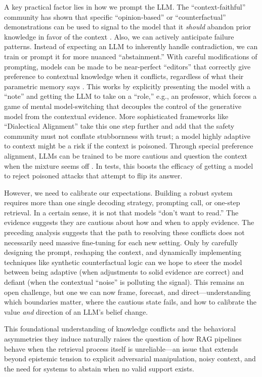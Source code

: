 \documentclass[11pt]{article}
\begin{document}
A key practical factor lies in how we prompt the LLM. The ``context-faithful'' community has shown that specific ``opinion-based'' or ``counterfactual'' demonstrations can be used to signal to the model that it \emph{should} abandon prior knowledge in favor of the context \cite{ref254}. Also, we can actively anticipate failure patterns. Instead of expecting an LLM to inherently handle contradiction, we can train or prompt it for more nuanced ``abstainment.'' With careful modifications of prompting, models can be made to be near-perfect ``editors'' that correctly give preference to contextual knowledge when it conflicts, regardless of what their parametric memory says \cite{ref255}. This works by explicitly presenting the model with a ``note'' and getting the LLM to take on a ``role,'' e.g., an professor, which forces a game of mental model-switching that decouples the control of the generative model from the contextual evidence. More sophisticated frameworks like ``Dialectical Alignment'' take this one step further and add that the safety community must not conflate stubbornness with trust; a model highly adaptive to context might be a risk if the context is poisoned. Through special preference alignment, LLMs can be trained to be more cautious and question the context when the mixture seems off \cite{ref180}. In tests, this boosts the efficacy of getting a model to reject poisoned attacks that attempt to flip its answer.

However, we need to calibrate our expectations. Building a robust system requires more than one single decoding strategy, prompting call, or one-step retrieval. In a certain sense, it is not that models ``don't want to read.'' The evidence suggests they are cautious about how and when to apply evidence. The preceding analysis suggests that the path to resolving these conflicts does not necessarily need massive fine-tuning for each new setting. Only by carefully designing the prompt, reshaping the context, and dynamically implementing techniques like synthetic counterfactual logic can we hope to steer the model between being adaptive (when adjustments to solid evidence are correct) and defiant (when the contextual ``noise'' is polluting the signal). This remains an open challenge, but one we can now frame, forecast, and direct---understanding which boundaries matter, where the cautious state fails, and how to calibrate the value \emph{and} direction of an LLM's belief change.

This foundational understanding of knowledge conflicts and the behavioral asymmetries they induce naturally raises the question of how RAG pipelines behave when the retrieval process itself is unreliable---an issue that extends beyond epistemic tension to explicit adversarial manipulation, noisy context, and the need for systems to abstain when no valid support exists.
\end{document}
